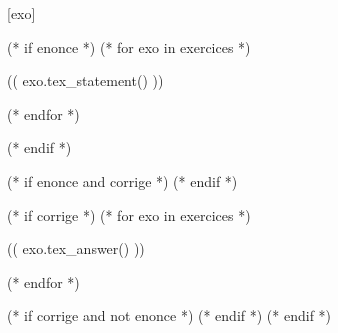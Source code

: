 \documentclass[a4paper,11pt]{article}
\newcounter{exo}
\begin{document}
[exo]
\renewcommand{\thenocalcul}{\Alph{nocalcul}}
\raggedcolumns
\setlength{\columnseprule}{0.5pt}

(* if enonce *)
    (* for exo in exercices *)

(( exo.tex_statement() ))

    (* endfor *)

\label{LastPage}
(* endif *)

(* if enonce and corrige *)
\newpage
{}
\setcounter{page}{1}
\setcounter{exo}{0}
(* endif *)

(* if corrige *)
    (* for exo in exercices *)

(( exo.tex_answer() ))

    (* endfor *)

\label{LastCorPage}
(* if corrige and not enonce *)
\label{LastPage}
(* endif *)
(* endif *)
\end{document}
